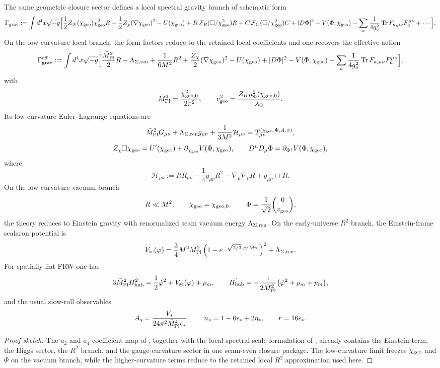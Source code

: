 \begin{theorem}
\label{thm:gravity-cosmology-closure}
The same geometric closure sector defines a local spectral gravity branch of schematic form
\[
\Gamma_{\mathrm{grav}}
:=
\int d^4x\sqrt{-g}\Big[
\frac12 Z_N(\chi_{\mathrm{geo}})\chi_{\mathrm{geo}}^2R
+\frac12 Z_\chi(\nabla\chi_{\mathrm{geo}})^2
-U(\chi_{\mathrm{geo}})
+R\,\mathcal F_R(\Box/\chi_{\mathrm{geo}}^2)R
+C\,\mathcal F_C(\Box/\chi_{\mathrm{geo}}^2)C
+|D\Phi|^2
-V(\Phi,\chi_{\mathrm{geo}})
-\sum_a \frac{1}{4g_a^2}\operatorname{Tr} F_{a,\mu\nu}F_a^{\mu\nu}
+\cdots
\Big].
\]
On the low-curvature local branch, the form factors reduce to the retained local coefficients and one recovers the effective action
\[
\Gamma_{\mathrm{grav}}^{\mathrm{eff}}
:=
\int d^4x\sqrt{-g}\Big[
\frac{\bar M_{\mathrm{Pl}}^2}{2}R
-\Lambda_{\Sigma,\mathrm{ren}}
+\frac{1}{6M^2}R^2
+\frac{Z_\chi}{2}(\nabla\chi_{\mathrm{geo}})^2
-U(\chi_{\mathrm{geo}})
+|D\Phi|^2
-V(\Phi,\chi_{\mathrm{geo}})
-\sum_a \frac{1}{4g_a^2}\operatorname{Tr} F_{a,\mu\nu}F_a^{\mu\nu}
\Big],
\]
with
\[
\bar M_{\mathrm{Pl}}^2=\frac{\chi_{\mathrm{geo},0}^2}{2\pi^2},
\qquad
v_{\mathrm{geo}}^2=\frac{Z_H\mu_\Phi^2(\chi_{\mathrm{geo},0})}{\lambda_\Phi}.
\]
Its low-curvature Euler--Lagrange equations are
\[
\bar M_{\mathrm{Pl}}^2 G_{\mu\nu}
+\Lambda_{\Sigma,\mathrm{ren}} g_{\mu\nu}
+\frac{1}{3M^2}\mathcal H_{\mu\nu}
=
T_{\mu\nu}^{(\chi_{\mathrm{geo}},\Phi,A,\psi)},
\]
\[
Z_\chi\Box\chi_{\mathrm{geo}}=U'(\chi_{\mathrm{geo}})+\partial_{\chi_{\mathrm{geo}}}V(\Phi,\chi_{\mathrm{geo}}),
\qquad
D^\mu D_\mu\Phi=\partial_{\Phi^\dagger}V(\Phi,\chi_{\mathrm{geo}}),
\]
where
\[
\mathcal H_{\mu\nu}
:=
RR_{\mu\nu}
-\frac14 g_{\mu\nu}R^2
-\nabla_\mu\nabla_\nu R
+g_{\mu\nu}\Box R.
\]
On the low-curvature vacuum branch
\[
R\ll M^2,
\qquad
\chi_{\mathrm{geo}}=\chi_{\mathrm{geo},0},
\qquad
\Phi=\frac{1}{\sqrt2}\binom{0}{v_{\mathrm{geo}}},
\]
the theory reduces to Einstein gravity with renormalized seam vacuum energy $\Lambda_{\Sigma,\mathrm{ren}}$.
On the early-universe $R^2$ branch, the Einstein-frame scalaron potential is
\[
V_{\mathrm{sc}}(\varphi)
=
\frac34 M^2\bar M_{\mathrm{Pl}}^2
\left(1-e^{-\sqrt{2/3}\,\varphi/\bar M_{\mathrm{Pl}}}\right)^2
+\Lambda_{\Sigma,\mathrm{ren}}.
\]
For spatially flat FRW one has
\[
3\bar M_{\mathrm{Pl}}^2H_{\mathrm{hub}}^2
=
\frac12\dot\varphi^2+V_{\mathrm{sc}}(\varphi)+\rho_m,
\qquad
\dot{H_{\mathrm{hub}}}
=
-\frac{1}{2\bar M_{\mathrm{Pl}}^2}\bigl(\dot\varphi^2+\rho_m+p_m\bigr),
\]
and the usual slow-roll observables
\[
A_s=\frac{V_*}{24\pi^2\bar M_{\mathrm{Pl}}^4\epsilon_*},
\qquad
n_s=1-6\epsilon_*+2\eta_*,
\qquad
r=16\epsilon_*.
\]
\end{theorem}

\begin{proof}[Proof sketch]
The $a_2$ and $a_4$ coefficient map of , together with the local spectral-scale formulation of , already contains the Einstein term, the Higgs sector, the $R^2$ branch, and the gauge-curvature sector in one seam-even closure package. The low-curvature limit freezes $\chi_{\mathrm{geo}}$ and $\Phi$ on the vacuum branch, while the higher-curvature terms reduce to the retained local $R^2$ approximation used here.
\end{proof}

